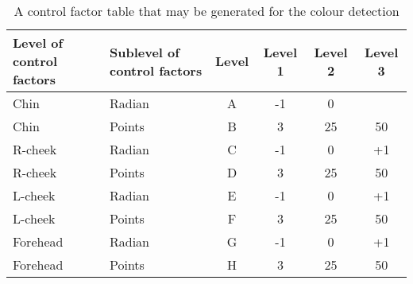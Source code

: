 \documentclass[acmsmall]{acmart}
\begin{document}
\begin{table}[h]
    \centering
    \begin{tabular}{|p{3cm}|p{3cm}|c|c|c|c|}
\hline
Level of control factors & Sublevel of control factors &  Level & Level 1 & Level 2 & Level 3\\
\hline
Chin &  Radian & A & -1 & 0 & \\
\hline
Chin & Points & B & 3 & 25 & 50\\
\hline
R-cheek & Radian & C & -1 & 0 & +1\\
\hline
R-cheek & Points & D & 3 & 25 & 50\\
\hline
L-cheek & Radian & E & -1 & 0 & +1\\
\hline
L-cheek & Points & F & 3 & 25 & 50\\
\hline
Forehead & Radian & G & -1 & 0 & +1\\
\hline
Forehead & Points & H & 3 & 25 & 50\\
\hline
\end{tabular}
    \caption{ A control factor table that may be generated for the colour detection}
    \label{tab1}
\end{table}
\end{document}
